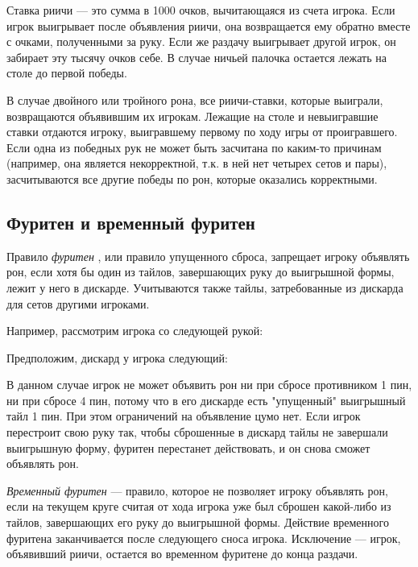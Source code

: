 Ставка риичи --- это сумма в 1000 очков, вычитающаяся из счета игрока. Если игрок выигрывает после объявления риичи, она возвращается ему обратно вместе с очками, полученными за руку. Если же раздачу выигрывает другой игрок, он забирает эту тысячу очков себе. В случае ничьей палочка остается лежать на столе до первой победы.

В случае двойного или тройного рона, все риичи-ставки, которые выиграли, возвращаются объявившим их игрокам. Лежащие на столе и невыигравшие ставки отдаются игроку, выигравшему первому по ходу игры от проигравшего. Если одна из победных рук не может быть засчитана по каким-то причинам (например, она является некорректной, т.к. в ней нет четырех сетов и пары), засчитываются все другие победы по рон, которые оказались корректными.



\subsection{Фуритен и временный фуритен}

Правило \textit{фуритен} , или правило упущенного сброса, запрещает игроку объявлять рон, если хотя бы один из тайлов, завершающих руку до выигрышной формы, лежит у него в дискарде. Учитываются также тайлы, затребованные из дискарда для сетов другими игроками. 

\begin{additional}
	
	Например, рассмотрим игрока со следующей рукой:
	
	
	Предположим, дискард у игрока следующий:
	
	
	В данном случае игрок не может объявить рон ни при сбросе противником 1 пин, ни при сбросе 4 пин, потому что в его дискарде есть "упущенный" выигрышный тайл 1 пин. При этом ограничений на объявление цумо нет. Если игрок перестроит свою руку так, чтобы сброшенные в дискард тайлы не завершали выигрышную форму, фуритен перестанет действовать, и он снова сможет объявлять рон. 
\end{additional}

\textit{Временный фуритен} --- правило, которое не позволяет игроку объявлять рон, если на текущем круге считая от хода игрока уже был сброшен какой-либо из тайлов, завершающих его руку до выигрышной формы. Действие временного фуритена заканчивается после следующего сноса игрока. Исключение --- игрок, объявивший риичи, остается во временном фуритене до конца раздачи.

